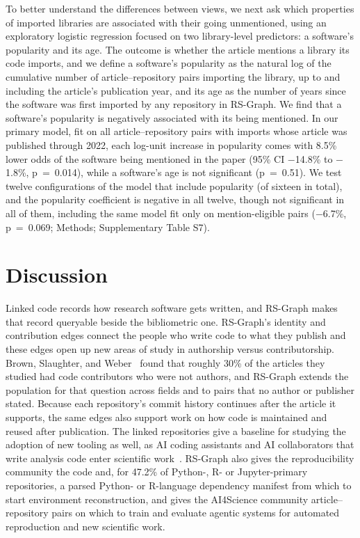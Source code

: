 \documentclass[pdflatex,sn-nature]{sn-jnl}%
\begin{document}
To better understand the differences between views, we next ask which properties of imported libraries are associated with their going unmentioned, using an exploratory logistic regression focused on two library-level predictors: a software's popularity and its age. The outcome is whether the article mentions a library its code imports, and we define a software's popularity as the natural log of the cumulative number of article--repository pairs importing the library, up to and including the article's publication year, and its age as the number of years since the software was first imported by any repository in RS-Graph. We find that a software's popularity is negatively associated with its being mentioned. In our primary model, fit on all article--repository pairs with imports whose article was published through 2022, each log-unit increase in popularity comes with 8.5\% lower odds of the software being mentioned in the paper (95\% CI $-$14.8\% to $-$1.8\%, p~=~0.014), while a software's age is not significant (p~=~0.51). We test twelve configurations of the model that include popularity (of sixteen in total), and the popularity coefficient is negative in all twelve, though not significant in all of them, including the same model fit only on mention-eligible pairs ($-$6.7\%, p~=~0.069; Methods; Supplementary Table S7).

\section{Discussion}\label{sec:discussion}

Linked code records how research software gets written, and RS-Graph makes that record queryable beside the bibliometric one. RS-Graph's identity and contribution edges connect the people who write code to what they publish and these edges open up new areas of study in authorship versus contributorship. Brown, Slaughter, and Weber~\cite{brown2026code} found that roughly 30\% of the articles they studied had code contributors who were not authors, and RS-Graph extends the population for that question across fields and to pairs that no author or publisher stated. Because each repository's commit history continues after the article it supports, the same edges also support work on how code is maintained and reused after publication. The linked repositories give a baseline for studying the adoption of new tooling as well, as AI coding assistants and AI collaborators that write analysis code enter scientific work~\cite{shao2026sciscigpt}. RS-Graph also gives the reproducibility community the code and, for 47.2\% of Python-, R- or Jupyter-primary repositories, a parsed Python- or R-language dependency manifest from which to start environment reconstruction, and gives the AI4Science community article--repository pairs on which to train and evaluate agentic systems for automated reproduction and new scientific work.
\end{document}
